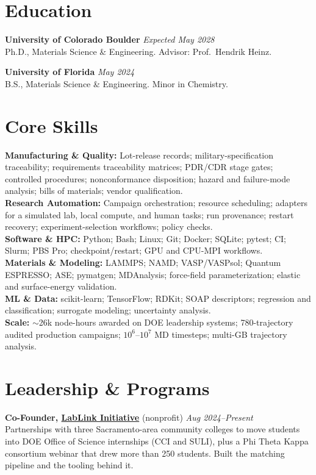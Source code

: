 \documentclass[letterpaper,10pt]{article}
\newcommand{\keepsection}{\needspace{6\baselineskip}}
\begin{document}
\keepsection\section*{Education}
\textbf{University of Colorado Boulder} \hfill \textit{Expected May 2028}\\
Ph.D., Materials Science \& Engineering. Advisor: Prof.\ Hendrik Heinz.

\textbf{University of Florida} \hfill \textit{May 2024}\\
B.S., Materials Science \& Engineering. Minor in Chemistry.

\keepsection\section*{Core Skills}
\textbf{Manufacturing \& Quality:} Lot-release records; military-specification traceability; requirements traceability matrices; PDR/CDR stage gates; controlled procedures; nonconformance disposition; hazard and failure-mode analysis; bills of materials; vendor qualification.\\
\textbf{Research Automation:} Campaign orchestration; resource scheduling; adapters for a simulated lab, local compute, and human tasks; run provenance; restart recovery; experiment-selection workflows; policy checks.\\
\textbf{Software \& HPC:} Python; Bash; Linux; Git; Docker; SQLite; pytest; CI; Slurm; PBS Pro; checkpoint/restart; GPU and CPU-MPI workflows.\\
\textbf{Materials \& Modeling:} LAMMPS; NAMD; VASP/VASPsol; Quantum ESPRESSO; ASE; pymatgen; MDAnalysis; force-field parameterization; elastic and surface-energy validation.\\
\textbf{ML \& Data:} scikit-learn; TensorFlow; RDKit; SOAP descriptors; regression and classification; surrogate modeling; uncertainty analysis.\\
\textbf{Scale:} \(\sim\)26k node-hours awarded on DOE leadership systems; 780-trajectory audited production campaigns; \(10^6\text{--}10^7\) MD timesteps; multi-GB trajectory analysis.

\keepsection\section*{Leadership \& Programs}
\textbf{Co-Founder, \href{https://www.lablinkinitiative.org}{LabLink Initiative}} (nonprofit) \hfill \textit{Aug 2024--Present}\\
Partnerships with three Sacramento-area community colleges to move students into DOE Office of Science internships (CCI and SULI), plus a Phi Theta Kappa consortium webinar that drew more than 250 students. Built the matching pipeline and the tooling behind it.
\end{document}
